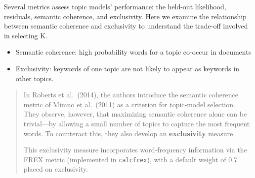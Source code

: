 \documentclass[
]{book}
\newenvironment{Shaded}{\begin{snugshade}}{\end{snugshade}}
\newcommand{\AttributeTok}[1]{\textcolor[rgb]{0.13,0.29,0.53}{#1}}
\newcommand{\DecValTok}[1]{\textcolor[rgb]{0.00,0.00,0.81}{#1}}
\newcommand{\FloatTok}[1]{\textcolor[rgb]{0.00,0.00,0.81}{#1}}
\newcommand{\FunctionTok}[1]{\textcolor[rgb]{0.13,0.29,0.53}{\textbf{#1}}}
\newcommand{\NormalTok}[1]{#1}
\newcommand{\SpecialCharTok}[1]{\textcolor[rgb]{0.81,0.36,0.00}{\textbf{#1}}}
\newcommand{\StringTok}[1]{\textcolor[rgb]{0.31,0.60,0.02}{#1}}
\begin{document}
Several metrics assess topic models' performance: the held-out likelihood, residuals, semantic coherence, and exclusivity. Here we examine the relationship between semantic coherence and exclusivity to understand the trade-off involved in selecting K.

\begin{itemize}
\item
  Semantic coherence: high probability words for a topic co-occur in documents
\item
  Exclusivity: keywords of one topic are not likely to appear as keywords in other topics.
\end{itemize}

\begin{quote}
In Roberts et al.~(2014), the authors introduce the semantic coherence metric of Mimno et al.~(2011) as a criterion for topic‐model selection. They observe, however, that maximizing semantic coherence alone can be trivial---by allowing a small number of topics to capture the most frequent words. To counteract this, they also develop an \textbf{exclusivity} measure.

This exclusivity measure incorporates word‐frequency information via the FREX metric (implemented in \texttt{calcfrex}), with a default weight of 0.7 placed on exclusivity.
\end{quote}

\begin{Shaded}
\end{Shaded}
\end{document}
